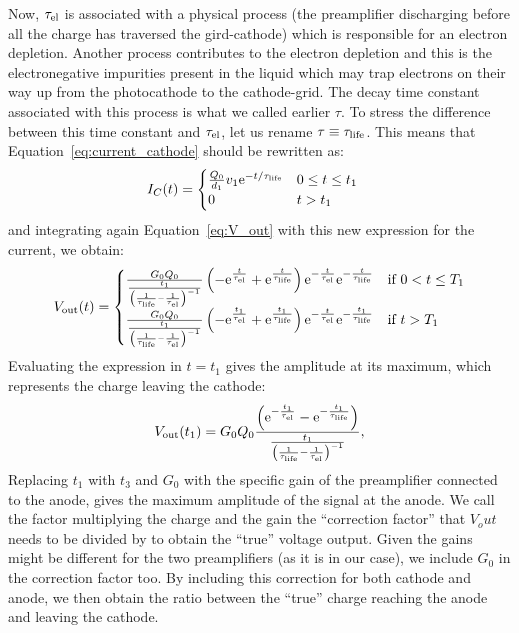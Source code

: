 \documentclass[a4paper,11pt]{article}
\providecommand*{\eu}%
{\ensuremath{\mathrm{e}}}
\begin{document}
Now, $\tau_{\rm el}$ is associated with a physical process (the preamplifier discharging before all the charge has traversed the gird-cathode) which is responsible for an electron depletion. Another process contributes to the electron depletion and this is the electronegative impurities present in the liquid which may trap electrons on their way up from the photocathode to the cathode-grid. The decay time constant associated with this process is what we called earlier $\tau$. To stress the difference between this time constant and $\tau_{\rm el}$, let us rename $\tau \equiv \tau_{\rm life}$.
This means that Equation~\ref{eq:current_cathode} should be rewritten as:
\begin{align}
 I_C(t) &=
  \begin{cases}
   \frac{Q_0}{d_1}v_{1} \eu^{-t/\tau_{\rm life}}  
                            & 0 \leq t \leq t_{1} \\
   0        			    & t > t_{1}
  \end{cases}
\end{align}
and integrating again Equation~\ref{eq:V_out} with this new expression for the current, we obtain:
\begin{equation}
V_{\rm out} (t) = \begin{cases}
\frac{G_0 Q_0
}{
\frac{t_{1}}{\left (\frac{1}{\tau_{\rm life}}-\frac{1}{\tau_{\rm el}}\right )^{-1}}
} \left(-\eu^{\frac{t}{\tau_{\rm el}}}+\eu^{\frac{t}{\tau_{\rm life}}}\right) \eu^{-\frac{t}{\tau_{\rm el}}} \eu^{-\frac{t}{\tau_{\rm life}}} &\text{if $0 < t \leq T_1$}\\
\frac{G_0 Q_0
}{
\frac{t_{1}}{\left (\frac{1}{\tau_{\rm life}}-\frac{1}{\tau_{\rm el}}\right )^{-1}}
} \left(-\eu^{\frac{t_1}{\tau_{\rm el}}}+\eu^{\frac{t_1}{\tau_{\rm life}}}\right) \eu^{-\frac{t}{\tau_{\rm el}}} \eu^{-\frac{t_1}{\tau_{\rm life}}} &\text{if $t > T_1$}
\end{cases}
\label{eq:fittingFunction}
\end{equation}
Evaluating the expression in $t=t_1$ gives the amplitude at its maximum, which represents the charge leaving the cathode: 
\begin{equation}
V_{\rm out}(t_1) = G_0 Q_0 \frac{
\left(\eu^{-\frac{t_1}{\tau_{\rm el}}}-\eu^{-\frac{t_1}{\tau_{\rm life}}}\right)
}{
\frac{t_{1}}{\left (\frac{1}{\tau_{\rm life}}-\frac{1}{\tau_{\rm el}}\right )^{-1}}
},
\end{equation}
Replacing $t_1$ with $t_3$ and $G_0$ with the specific gain of the preamplifier connected to the anode, gives the maximum amplitude of the signal at the anode. 
We call the factor multiplying the charge and the gain the ``correction factor'' that $V_out$ needs to be divided by to obtain the ``true'' voltage output. Given the gains might be different for the two preamplifiers (as it is in our case), we include $G_0$ in the correction factor too. By including this correction for both cathode and anode, we then obtain the ratio between the ``true'' charge reaching the anode and leaving the cathode. 



\begingroup
    \setlength{\bibsep}{10pt}
    
\endgroup
\end{document}
